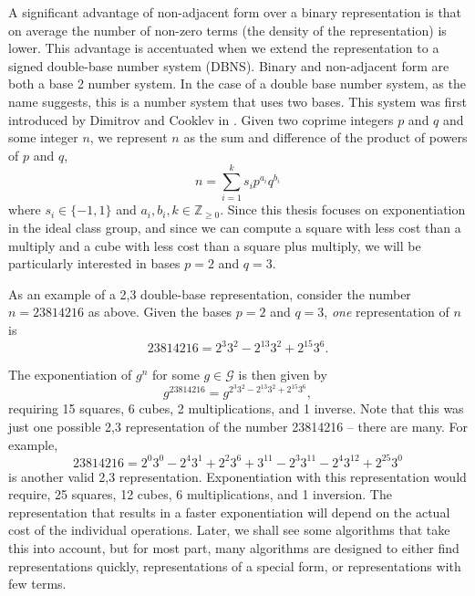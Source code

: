 \documentclass{ucalgthes1}
\theoremstyle{plain}
\theoremstyle{definition}
\newcommand{\ZZgez}{\mathbb{Z}_{\ge 0}}
\begin{document}
A significant advantage of non-adjacent form over a binary representation is that on average the number of non-zero terms (the density of the representation) is lower.  This advantage is accentuated when we extend the representation to a signed double-base number system (DBNS).  Binary and non-adjacent form are both a base 2 number system.  In the case of a double base number system, as the name suggests, this is a number system that uses two bases.  This system was first introduced by Dimitrov and Cooklev in \cite{Dimitrov1995}.  Given two coprime integers $p$ and $q$ and some integer $n$, we represent $n$ as the sum and difference of the product of powers of $p$ and $q$,
\begin{equation}\label{eq:generalDbnsForm}
	n = \sum_{i=1}^k s_i p^{a_i} q^{b_i}
\end{equation}
where $s_i \in \{-1, 1\}$ and $a_i, b_i, k \in \ZZgez$.  Since this thesis focuses on exponentiation in the ideal class group, and since we can compute a square with less cost than a multiply and a cube with less cost than a square plus multiply, we will be particularly interested in bases $p=2$ and $q=3$.

As an example of a 2,3 double-base representation, consider the number $n=23814216$ as above.  Given the bases $p=2$ and $q=3$, \emph{one} representation of $n$ is
\[
	23814216 = 2^3 3^2 -2^{13} 3^2 +2^{15} 3^6.
\]

The exponentiation of $g^n$ for some $g \in \mathcal G$ is then given by
\[
	g^{23814216} = g^{2^3 3^2 -2^{13} 3^2 +2^{15} 3^6},
\]
requiring 15 squares, 6 cubes, 2 multiplications, and 1 inverse.  Note that this was just one possible 2,3 representation of the number 23814216 -- there are many.  For example,
\begin{equation}\label{eq:unchainedEg}
	23814216 = 2^0 3^0 - 2^4 3^1 + 2^2 3^6 + 3^{11} - 2^3 3^{11} - 2^4 3^{12} + 2^{25} 3^0
\end{equation}
is another valid 2,3 representation.  Exponentiation with this representation would require, 25 squares, 12 cubes, 6 multiplications, and 1 inversion.  The representation that results in a faster exponentiation will depend on the actual cost of the individual operations.  Later, we shall see some algorithms that take this into account, but for most part, many algorithms are designed to either find representations quickly, representations of a special form, or representations with few terms.
\end{document}
